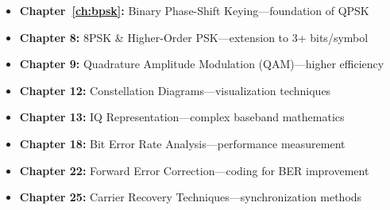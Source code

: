 \begin{itemize}
\item \textbf{Chapter~\ref{ch:bpsk}:} Binary Phase-Shift Keying---foundation of QPSK
\item \textbf{Chapter 8:} 8PSK \& Higher-Order PSK---extension to 3+ bits/symbol
\item \textbf{Chapter 9:} Quadrature Amplitude Modulation (QAM)---higher efficiency
\item \textbf{Chapter 12:} Constellation Diagrams---visualization techniques
\item \textbf{Chapter 13:} IQ Representation---complex baseband mathematics
\item \textbf{Chapter 18:} Bit Error Rate Analysis---performance measurement
\item \textbf{Chapter 22:} Forward Error Correction---coding for BER improvement
\item \textbf{Chapter 25:} Carrier Recovery Techniques---synchronization methods
\end{itemize}
